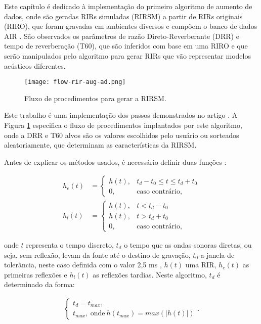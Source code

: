Este capítulo é dedicado à implementação do primeiro algoritmo de aumento de dados, onde são geradas RIRs simuladas (RIRSM)
a partir de RIRs originais (RIRO), que foram gravadas em ambientes diversos e compõem o banco de dados AIR \cite{AIR_Database}. 
São observados os parâmetros de razão Direto-Reverberante (DRR) e tempo de reverberação (T60), que são
inferidos com base em uma RIRO e que serão manipulados pelo algoritmo para gerar RIRs que vão representar modelos acústicos diferentes.

\begin{figure} [H]
    \centering
    \texttt{[image: flow-rir-aug-ad.png]}
    \caption{Fluxo de procedimentos para gerar a RIRSM.}
    \label{fig:flow-rir-aug}
\end{figure}

Este trabalho é uma implementação dos passos demonstrados no artigo \cite{RIR_Data_Aug}. A Figura \ref{fig:flow-rir-aug} especifica 
o fluxo de procedimentos implantados por este algoritmo, onde a DRR e T60 alvos são os valores escolhidos pelo usuário ou sorteados aleatoriamente,
que determinam as características da RIRSM. 

Antes de explicar os métodos usados, é necessário definir duas funções \cite{RIR_Data_Aug}:

\begin{align} 
    h_e(t) &= 
    \begin{cases} \label{eqn:rir-early}
        h(t), & t_d-t_0 \le t \le t_d+t_0 \\
        0, & \text{caso contrário,}
    \end{cases} \\
    h_l(t) &= 
    \begin{cases} \label{eqn:rir-late}
        h(t), & t < t_d - t_0 \\
        h(t), & t > t_d + t_0 \\
        0, & \text{caso contrário,}
    \end{cases}
\end{align}

\noindent
onde $t$ representa o tempo discreto, $t_d$ o tempo que as ondas sonoras diretas, ou seja, sem reflexão, levam da fonte até o destino de gravação,
$t_0$ a janela de tolerância, neste caso definida com o valor 2,5 ms \cite{RIR_Data_Aug}, 
$h(t)$ uma RIR, $h_e(t)$ as primeiras reflexões e $h_l(t)$ as reflexões tardias.
Neste algoritmo, $t_d$ é determinado da forma:

\begin{align} \label{eqn:t_d}
    \begin{cases}
        t_d = t_{max},\\
        t_{max}, \ \text{onde} \ h(t_{max}) = max(|h(t)|)
    \end{cases}
    .
\end{align}


